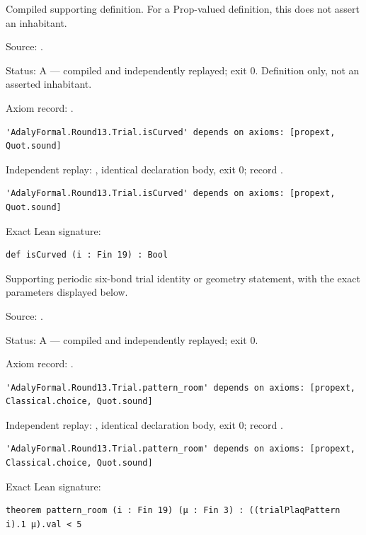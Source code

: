 \begin{definition}[bp-404]
\label{bp-404}
\uses{}
\leanok
Compiled supporting definition. For a Prop-valued definition, this does not assert an inhabitant.

\par Source: \texttt{}.
\par Status: A — compiled and independently replayed; exit 0. Definition only, not an asserted inhabitant.
\par Axiom record: \texttt{}.
\begin{verbatim}
'AdalyFormal.Round13.Trial.isCurved' depends on axioms: [propext, Quot.sound]
\end{verbatim}
\par Independent replay: \texttt{}, identical declaration body, exit 0; record \texttt{}.
\begin{verbatim}
'AdalyFormal.Round13.Trial.isCurved' depends on axioms: [propext, Quot.sound]
\end{verbatim}
\par Exact Lean signature:
\begin{verbatim}
def isCurved (i : Fin 19) : Bool
\end{verbatim}
\end{definition}

\begin{theorem}[bp-405]
\label{bp-405}
\leanok
Supporting periodic six-bond trial identity or geometry statement, with the exact parameters displayed below.

\par Source: \texttt{}.
\par Status: A — compiled and independently replayed; exit 0.
\par Axiom record: \texttt{}.
\begin{verbatim}
'AdalyFormal.Round13.Trial.pattern_room' depends on axioms: [propext, Classical.choice, Quot.sound]
\end{verbatim}
\par Independent replay: \texttt{}, identical declaration body, exit 0; record \texttt{}.
\begin{verbatim}
'AdalyFormal.Round13.Trial.pattern_room' depends on axioms: [propext, Classical.choice, Quot.sound]
\end{verbatim}
\par Exact Lean signature:
\begin{verbatim}
theorem pattern_room (i : Fin 19) (μ : Fin 3) : ((trialPlaqPattern i).1 μ).val < 5
\end{verbatim}
\end{theorem}

